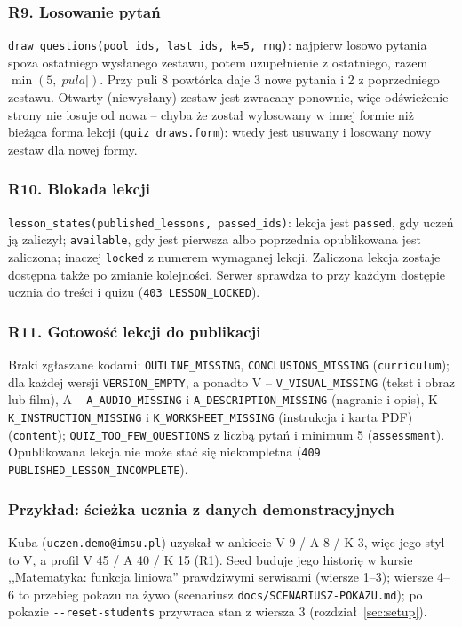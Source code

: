 \subsubsection{R9. Losowanie pytań}
\texttt{draw\_questions(pool\_ids, last\_ids, k=5, rng)}: najpierw losowo pytania spoza ostatniego wysłanego zestawu, potem uzupełnienie z ostatniego, razem $\min(5, |\textit{pula}|)$. Przy puli 8 powtórka daje 3 nowe pytania i 2 z poprzedniego zestawu. Otwarty (niewysłany) zestaw jest zwracany ponownie, więc odświeżenie strony nie losuje od nowa -- chyba że został wylosowany w innej formie niż bieżąca forma lekcji (\texttt{quiz\_draws.form}): wtedy jest usuwany i losowany nowy zestaw dla nowej formy.

\subsubsection{R10. Blokada lekcji}
\texttt{lesson\_states(published\_lessons, passed\_ids)}: lekcja jest \texttt{passed}, gdy uczeń ją zaliczył; \texttt{available}, gdy jest pierwsza albo poprzednia opublikowana jest zaliczona; inaczej \texttt{locked} z numerem wymaganej lekcji. Zaliczona lekcja zostaje dostępna także po zmianie kolejności. Serwer sprawdza to przy każdym dostępie ucznia do treści i quizu (\texttt{403 LESSON\_LOCKED}).

\subsubsection{R11. Gotowość lekcji do publikacji}
Braki zgłaszane kodami: \texttt{OUTLINE\_MISSING}, \texttt{CONCLUSIONS\_MISSING} (\texttt{curriculum}); dla każdej wersji \texttt{VERSION\_EMPTY}, a ponadto V -- \texttt{V\_VISUAL\_MISSING} (tekst i obraz lub film), A -- \texttt{A\_AUDIO\_MISSING} i \texttt{A\_DESCRIPTION\_MISSING} (nagranie i opis), K -- \texttt{K\_INSTRUCTION\_MISSING} i \texttt{K\_WORKSHEET\_MISSING} (instrukcja i karta PDF) (\texttt{content}); \texttt{QUIZ\_TOO\_FEW\_QUESTIONS} z liczbą pytań i minimum 5 (\texttt{assessment}). Opublikowana lekcja nie może stać się niekompletna (\texttt{409 PUBLISHED\_LESSON\_INCOMPLETE}).

\subsubsection{Przykład: ścieżka ucznia z danych demonstracyjnych}
\label{sec:rules-example}

Kuba (\texttt{uczen.demo@imsu.pl}) uzyskał w ankiecie V 9 / A 8 / K 3, więc jego styl to V, a profil V 45 / A 40 / K 15 (R1). Seed buduje jego historię w kursie ,,Matematyka: funkcja liniowa'' prawdziwymi serwisami (wiersze 1--3); wiersze 4--6 to przebieg pokazu na żywo (scenariusz \nolinkurl{docs/SCENARIUSZ-POKAZU.md}); po pokazie \texttt{-{}-reset-students} przywraca stan z wiersza 3 (rozdział~\ref{sec:setup}).

